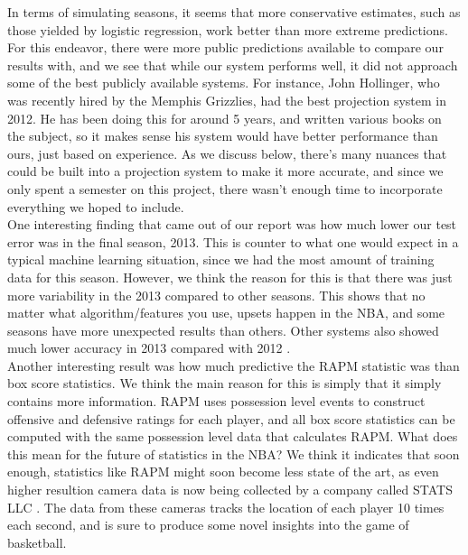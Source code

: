 \documentclass{article} %
\begin{document}
In terms of simulating seasons, it seems that more conservative estimates, such as those yielded by logistic regression, work better than more extreme predictions. For this endeavor, there were more public predictions available to compare our results with, and we see that while our system performs well, it did not approach some of the best publicly available systems. For instance, John Hollinger, who was recently hired by the Memphis Grizzlies, had the best projection system in 2012. He has been doing this for around 5 years, and written various books on the subject, so it makes sense his system would have better performance than ours, just based on experience. As we discuss below, there's many nuances that could be built into a projection system to make it more accurate, and since we only spent a semester on this project, there wasn't enough time to incorporate everything we hoped to include. \\


One interesting finding that came out of our report was how much lower our test error was in the final season, 2013. This is counter to what one would expect in a typical machine learning situation, since we had the most amount of training data for this season. However, we think the reason for this is that there was just more variability in the 2013 compared to other seasons. This shows that no matter what algorithm/features you use, upsets happen in the NBA, and some seasons have more unexpected results than others. Other systems also showed much lower accuracy in 2013 compared with 2012 \cite{projections}. \\ %


Another interesting result was how much predictive the RAPM statistic was than box score statistics. We think the main reason for this is simply that it simply contains more information. RAPM uses possession level events to construct offensive and defensive ratings for each player, and all box score statistics can be computed with the same possession level data that calculates RAPM. What does this mean for the future of statistics in the NBA? We think it indicates that soon enough, statistics like RAPM might soon become less state of the art, as even higher resultion camera data is now being collected by a company called STATS LLC \cite{sportsvu}. The data from these cameras tracks the location of each player 10 times each second, and is sure to produce some novel insights into the game of basketball. \\
\end{document}
